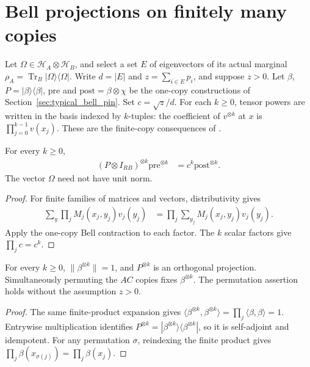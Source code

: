 \section{Bell projections on finitely many copies}
\label{sec:typical_bell_pin_powers}

Let $\Omega\in\mathcal H_A\otimes\mathcal H_B$, and select a set $E$ of
eigenvectors of its actual marginal
$\rho_A=\operatorname{Tr}_B|\Omega\rangle\langle\Omega|$.
Write $d=|E|$ and $z=\sum_{i\in E}p_i$, and suppose $z>0$.
Let $\beta$, $P=|\beta\rangle\langle\beta|$, $\mathrm{pre}$ and
$\mathrm{post}=\beta\otimes\chi$ be the one-copy constructions of
Section~\ref{sec:typical_bell_pin}. Set $c=\sqrt z/d$.
For each $k\ge0$, tensor powers are written in the basis indexed by
$k$-tuples: the coefficient of $v^{\otimes k}$ at $x$ is
$\prod_{j=0}^{k-1}v(x_j)$. These are the finite-copy consequences of
\cite[Section~7]{OpenAI2026AreaLaw}.

\begin{theorem}
\label{thm:typical_bell_pin_powers}
\leanok
{}
For every $k\ge0$,
\begin{align}
 (P\otimes I_{RB})^{\otimes k}\mathrm{pre}^{\otimes k}
   &=c^k\mathrm{post}^{\otimes k}.
 \label{eq:bell_powers_contraction}
\end{align}
The vector $\Omega$ need not have unit norm.
\end{theorem}
\begin{proof}
\leanok
{}
For finite families of matrices and vectors, distributivity gives
\begin{align}
 \sum_y\prod_j M_j(x_j,y_j)v_j(y_j)
   &=\prod_j\sum_{y_j}M_j(x_j,y_j)v_j(y_j).
 \label{eq:bell_powers_productsum}
\end{align}
Apply the one-copy Bell contraction to each factor. The $k$ scalar factors
give $\prod_jc=c^k$.
\end{proof}

\begin{theorem}
\label{thm:typical_bell_powers_projection}
\leanok
{}
For every $k\ge0$, $\|\beta^{\otimes k}\|=1$, and $P^{\otimes k}$ is an
orthogonal projection. Simultaneously permuting the $AC$ copies fixes
$\beta^{\otimes k}$. The permutation assertion holds without the
assumption $z>0$.
\end{theorem}
\begin{proof}
\leanok
{}
The same finite-product expansion gives
$\langle\beta^{\otimes k},\beta^{\otimes k}\rangle
=\prod_j\langle\beta,\beta\rangle=1$.
Entrywise multiplication identifies
$P^{\otimes k}=|\beta^{\otimes k}\rangle\langle\beta^{\otimes k}|$,
so it is self-adjoint and idempotent.
For any permutation $\sigma$, reindexing the finite product gives
$\prod_j\beta(x_{\sigma(j)})=\prod_j\beta(x_j)$.
\end{proof}

